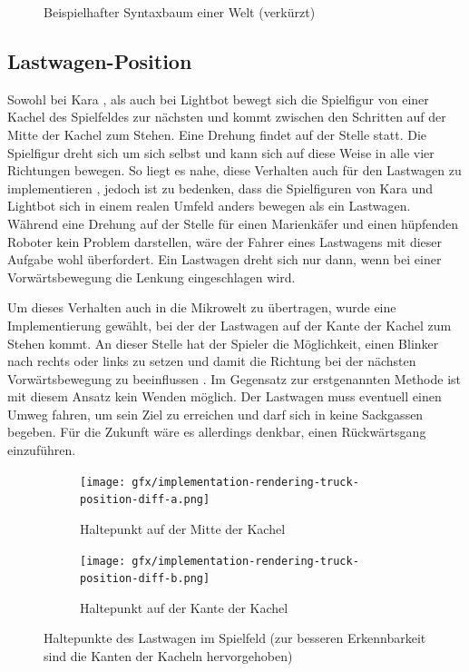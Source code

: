 \begin{figure}
  
  \caption{Beispielhafter Syntaxbaum einer Welt (verkürzt)}
  \label{fig:implementation:program:level-editor:tree}
\end{figure}

\subsection{Lastwagen-Position}
\label{sec:implementation:rendering:truck-position}

Sowohl bei Kara , als auch bei Lightbot  bewegt sich die Spielfigur von einer Kachel des Spielfeldes zur nächsten und kommt zwischen den Schritten auf der Mitte der Kachel zum Stehen. Eine Drehung findet auf der Stelle statt. Die Spielfigur dreht sich um sich selbst und kann sich auf diese Weise in alle vier Richtungen bewegen. So liegt es nahe, diese Verhalten auch für den Lastwagen zu implementieren , jedoch ist zu bedenken, dass die Spielfiguren von Kara und Lightbot sich in einem realen Umfeld anders bewegen als ein Lastwagen. Während eine Drehung auf der Stelle für einen Marienkäfer und einen hüpfenden Roboter kein Problem darstellen, wäre der Fahrer eines Lastwagens mit dieser Aufgabe wohl überfordert. Ein Lastwagen dreht sich nur dann, wenn bei einer Vorwärtsbewegung die Lenkung eingeschlagen wird.

Um dieses Verhalten auch in die Mikrowelt zu übertragen, wurde eine Implementierung gewählt, bei der der Lastwagen auf der Kante der Kachel zum Stehen kommt. An dieser Stelle hat der Spieler die Möglichkeit, einen Blinker nach rechts oder links zu setzen und damit die Richtung bei der nächsten Vorwärtsbewegung zu beeinflussen . Im Gegensatz zur erstgenannten Methode ist mit diesem Ansatz kein Wenden möglich. Der Lastwagen muss eventuell einen Umweg fahren, um sein Ziel zu erreichen und darf sich in keine Sackgassen begeben. Für die Zukunft wäre es allerdings denkbar, einen Rückwärtsgang einzuführen.

\begin{figure}
  \begin{subfigure}[b]{0.45\textwidth}
    \texttt{[image: gfx/implementation-rendering-truck-position-diff-a.png]}
    \caption{Haltepunkt auf der Mitte der Kachel}
    \label{fig:implementation:rendering:truck-position:diff:a}
  \end{subfigure}\hfill
  \begin{subfigure}[b]{0.45\textwidth}
    \texttt{[image: gfx/implementation-rendering-truck-position-diff-b.png]}
    \caption{Haltepunkt auf der Kante der Kachel}
    \label{fig:implementation:rendering:truck-position:diff:b}
  \end{subfigure}\hfill
  \caption{Haltepunkte des Lastwagen im Spielfeld (zur besseren Erkennbarkeit sind die Kanten der Kacheln hervorgehoben)}
  \label{fig:implementation:rendering:truck-position:diff}
\end{figure}


